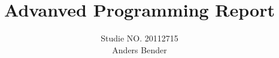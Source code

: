 

\title{Advanved Programming Report}

\author{Studie NO. 20112715\\Anders Bender}
\maketitle
\blankpage
{}

\newpage
{}
{}

